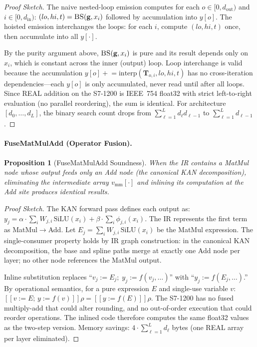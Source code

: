 \documentclass[journal,onecolumn]{IEEEtran}
\newtheorem{proposition}{Proposition}
\begin{document}
\begin{proof}[Proof Sketch]
The naive nested-loop emission computes for each $o \in [0, d_{\text{out}})$
and $i \in [0, d_{\text{in}})$:
$(lo, hi, t) = \textsc{BS}(\mathbf{g}, x_i)$ followed by accumulation into
$y[o]$. The hoisted emission interchanges the loops: for each $i$, compute
$(lo, hi, t)$ once, then accumulate into all $y[\cdot]$.

By the purity argument above, $\textsc{BS}(\mathbf{g}, x_i)$ is pure
and its result depends only on $x_i$, which is constant across the inner
(output) loop. Loop interchange is valid because the accumulation
$y[o] \mathrel{+}= \text{interp}(\mathbf{T}_{o,i}, lo, hi, t)$ has no
cross-iteration dependencies---each $y[o]$ is only accumulated, never read
until after all loops. Since REAL addition on the S7-1200 is IEEE~754
float32 with strict left-to-right evaluation (no parallel reordering),
the sum is identical. For architecture $[d_0,\dots,d_L]$, the binary
search count drops from $\sum_{\ell=1}^L d_\ell d_{\ell-1}$ to
$\sum_{\ell=1}^L d_{\ell-1}$.
\end{proof}

\paragraph{FuseMatMulAdd (Operator Fusion).}

\begin{proposition}[FuseMatMulAdd Soundness]
\label{prop:fuse_sound}
When the IR contains a MatMul node whose output feeds \textit{only} an Add
node (the canonical KAN decomposition), eliminating the intermediate array
$v_{\text{mm}}[\cdot]$ and inlining its computation at the Add site
produces identical results.
\end{proposition}

\begin{proof}[Proof Sketch]
The KAN forward pass defines each output as:
$y_j = \alpha \cdot \sum_i W_{j,i}\,\text{SiLU}(x_i) + \beta \cdot \sum_i \phi_{j,i}(x_i)$.
The IR represents the first term as MatMul$\rightarrow$Add. Let
$E_j = \sum_i W_{j,i}\,\text{SiLU}(x_i)$ be the MatMul expression.
The single-consumer property holds by IR graph construction: in the
canonical KAN decomposition, the base and spline paths merge at exactly
one Add node per layer; no other node references the MatMul output.

Inline substitution replaces ``$v_j := E_j;\; y_j := f(v_j, \ldots)$'' with
``$y_j := f(E_j, \ldots)$.'' By operational semantics, for a pure
expression $E$ and single-use variable $v$:
$[\![v:=E;\, y:=f(v)]\!]\rho = [\![y:=f(E)]\!]\rho$.
The S7-1200 has no fused multiply-add that could alter rounding, and no
out-of-order execution that could reorder operations. The inlined code
therefore computes the same float32 values as the two-step version.
Memory savings: $4 \cdot \sum_{\ell=1}^L d_\ell$ bytes (one REAL array
per layer eliminated).
\end{proof}
\end{document}
